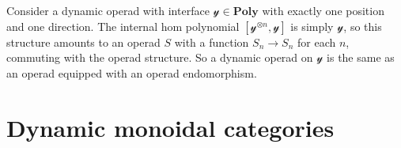 \documentclass[11pt, one side, article]{memoir}
\theoremstyle{definition}
\theoremstyle{plain}
\newenvironment{example}
  {\pushQED{\qed}\renewcommand{\qedsymbol}{$\lozenge$}\examplex}
  {\popQED\endexamplex}
\newcommand{\Cat}[1]{\mathbf{#1}}%
\newcommand{\yon}{\mathcal{y}}
\newcommand{\poly}{\Cat{Poly}}
\newcommand{\0}{\textsf{0}}
\newcommand{\1}{\tn{\textsf{1}}}
\begin{document}
\begin{example}
Consider a dynamic operad with interface $\yon\in\poly$ with exactly one position and one direction. The internal hom polynomial $[\yon^{\otimes n},\yon]$ is simply $\yon$, so this structure amounts to an operad $S$ with a function $S_n \to S_n$ for each $n$, commuting with the operad structure. So a dynamic operad on $\yon$ is the same as an operad equipped with an operad endomorphism.
\end{example}



\section{Dynamic monoidal categories}\label{sec:org_monoidalcats}
\end{document}
